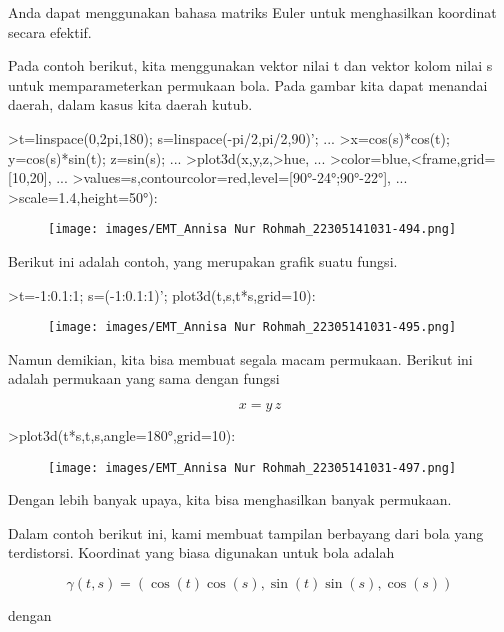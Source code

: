 \documentclass[a4paper,10pt]{article}
\begin{document}
\begin{eulernotebook}
\begin{eulercomment}
Anda dapat menggunakan bahasa matriks Euler untuk menghasilkan
koordinat secara efektif.

Pada contoh berikut, kita menggunakan vektor nilai t dan vektor kolom
nilai s untuk memparameterkan permukaan bola. Pada gambar kita dapat
menandai daerah, dalam kasus kita daerah kutub.
\end{eulercomment}
\begin{eulerprompt}
>t=linspace(0,2pi,180); s=linspace(-pi/2,pi/2,90)'; ...
>x=cos(s)*cos(t); y=cos(s)*sin(t); z=sin(s); ...
>plot3d(x,y,z,>hue, ...
>color=blue,<frame,grid=[10,20], ...
>values=s,contourcolor=red,level=[90°-24°;90°-22°], ...
>scale=1.4,height=50°):
\end{eulerprompt}
\begin{figure}[h]
    \centering
    \texttt{[image: images/EMT\_Annisa Nur Rohmah\_22305141031-494.png]}
\end{figure}
\begin{eulercomment}
Berikut ini adalah contoh, yang merupakan grafik suatu fungsi.
\end{eulercomment}
\begin{eulerprompt}
>t=-1:0.1:1; s=(-1:0.1:1)'; plot3d(t,s,t*s,grid=10):
\end{eulerprompt}
\begin{figure}[h]
    \centering
    \texttt{[image: images/EMT\_Annisa Nur Rohmah\_22305141031-495.png]}
\end{figure}
\begin{eulercomment}
Namun demikian, kita bisa membuat segala macam permukaan. Berikut ini
adalah permukaan yang sama dengan fungsi

\end{eulercomment}
\begin{eulerformula}
\[
x = y \, z
\]
\end{eulerformula}
\begin{eulerprompt}
>plot3d(t*s,t,s,angle=180°,grid=10):
\end{eulerprompt}
\begin{figure}[h]
    \centering
    \texttt{[image: images/EMT\_Annisa Nur Rohmah\_22305141031-497.png]}
\end{figure}
\begin{eulercomment}
Dengan lebih banyak upaya, kita bisa menghasilkan banyak permukaan.

Dalam contoh berikut ini, kami membuat tampilan berbayang dari bola
yang terdistorsi. Koordinat yang biasa digunakan untuk bola adalah

\end{eulercomment}
\begin{eulerformula}
\[
\gamma(t,s) = (\cos(t)\cos(s),\sin(t)\sin(s),\cos(s))
\]
\end{eulerformula}
\begin{eulercomment}
dengan


\end{eulercomment}
\end{eulernotebook}
\end{document}
